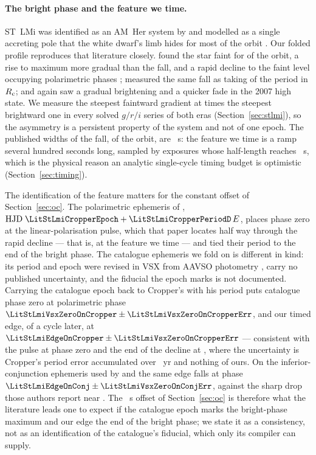 \paragraph{The bright phase and the feature we time.}
ST~LMi was identified as an AM~Her system by \citet{stockman1983} and
modelled as a single accreting pole that the white dwarf's limb hides for
most of the orbit \citep{schmidt1983, bailey1985, cropper1986}.  Our folded
profile reproduces that literature closely.  \citet{cropper1986} found the
star faint for \LitStLmiFaintFraction{} of the orbit, a rise to maximum
more gradual than the fall, and a rapid decline to the faint level
occupying polarimetric phases \LitStLmiFallPhases{};
\citet{peacock1992} measured the same fall as taking
\LitStLmiFallWidthPeacock{} of the period in $R_{\rm c}$; and
\citet{robertson2008} again saw a gradual brightening and a quicker fade in
the 2007 high state.  We measure the steepest faintward gradient at
\NumStLmiFallRiseRatioRange{} times the steepest brightward one in every
solved $g/r/i$ series of both eras (Section~\ref{sec:stlmi}), so the
asymmetry is a persistent property of the system and not of one epoch.
The published widths of the fall, \LitStLmiFallWidthRange{} of the orbit,
are \LitStLmiFallRangeS{}~s: the feature we time is a ramp several hundred
seconds long, sampled by exposures whose half-length reaches
\NumPolarHalfExposureS{}~s, which is the physical reason an analytic
single-cycle timing budget is optimistic (Section~\ref{sec:timing}).

The identification of the feature matters for the constant offset of
Section~\ref{sec:oc}.  The polarimetric ephemeris of \citet{cropper1986},
${\rm HJD}\;\LitStLmiCropperEpoch + \LitStLmiCropperPeriodD\,E$, places
phase zero at the linear-polarisation pulse, which that paper locates half
way through the rapid decline --- that is, at the feature we time ---
and \citet{bailey1985} tied their period to the end of the bright phase.
The catalogue ephemeris we fold on is different in kind: its period and
epoch were revised in VSX from AAVSO photometry \citep{watson2006}, carry
no published uncertainty, and the fiducial the epoch marks is not
documented.  Carrying the catalogue epoch back to Cropper's with his period
puts catalogue phase zero at polarimetric phase
$\LitStLmiVsxZeroOnCropper \pm \LitStLmiVsxZeroOnCropperErr$, and our timed
edge, \NumStLmiOcOffsetCycles{} of a cycle later, at
$\LitStLmiEdgeOnCropper \pm \LitStLmiVsxZeroOnCropperErr$ --- consistent
with the pulse at phase zero and the end of the decline at
\LitStLmiFallEndPhase{}, where the uncertainty is Cropper's period error
accumulated over \LitStLmiCropperBaselineYr{}~yr and nothing of ours.  On
the inferior-conjunction ephemeris used by \citet{kafka2007} and
\citet{robertson2008} the same edge falls at phase
$\LitStLmiEdgeOnConj \pm \LitStLmiVsxZeroOnConjErr$, against the sharp
drop those authors report near \LitStLmiDropPhaseRob{}.  The
\NumStLmiOcOffsetS{}~s offset of Section~\ref{sec:oc} is therefore what the
literature leads one to expect if the catalogue epoch marks the
bright-phase maximum and our edge the end of the bright phase; we state it
as a consistency, not as an identification of the catalogue's fiducial,
which only its compiler can supply.

